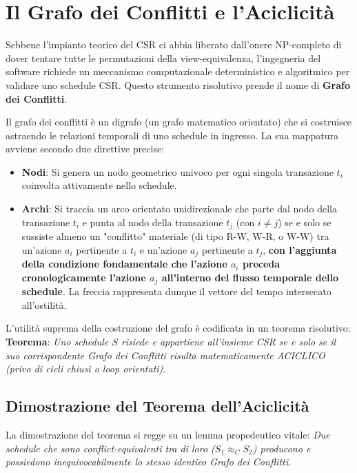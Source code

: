 \section{Il Grafo dei Conflitti e l'Aciclicità}

Sebbene l'impianto teorico del CSR ci abbia liberato dall'onere NP-completo di dover tentare tutte le permutazioni della view-equivalenza, l'ingegneria del software richiede un meccanismo computazionale deterministico e algoritmico per validare uno schedule CSR. Questo strumento risolutivo prende il nome di \textbf{Grafo dei Conflitti}.

Il grafo dei conflitti è un digrafo (un grafo matematico orientato) che si costruisce astraendo le relazioni temporali di uno schedule in ingresso. La sua mappatura avviene secondo due direttive precise:
\begin{itemize}
    \item \textbf{Nodi}: Si genera un nodo geometrico univoco per ogni singola transazione $t_i$ coinvolta attivamente nello schedule.
    \item \textbf{Archi}: Si traccia un arco orientato unidirezionale che parte dal nodo della transazione $t_i$ e punta al nodo della transazione $t_j$ (con $i \neq j$) se e solo se sussiste almeno un "conflitto" materiale (di tipo R-W, W-R, o W-W) tra un'azione $a_i$ pertinente a $t_i$ e un'azione $a_j$ pertinente a $t_j$, \textbf{con l'aggiunta della condizione fondamentale che l'azione $a_i$ preceda cronologicamente l'azione $a_j$ all'interno del flusso temporale dello schedule}. La freccia rappresenta dunque il vettore del tempo intersecato all'ostilità.
\end{itemize}

L'utilità suprema della costruzione del grafo è codificata in un teorema risolutivo:
\textbf{Teorema}: \textit{Uno schedule $S$ risiede e appartiene all'insieme CSR se e solo se il suo corrispondente Grafo dei Conflitti risulta matematicamente ACICLICO (privo di cicli chiusi o loop orientati)}.

\subsection{Dimostrazione del Teorema dell'Aciclicità}
La dimostrazione del teorema si regge su un lemma propedeutico vitale: \textit{Due schedule che sono conflict-equivalenti tra di loro ($S_1 \approx_C S_2$) producono e possiedono inequivocabilmente lo stesso identico Grafo dei Conflitti}.

